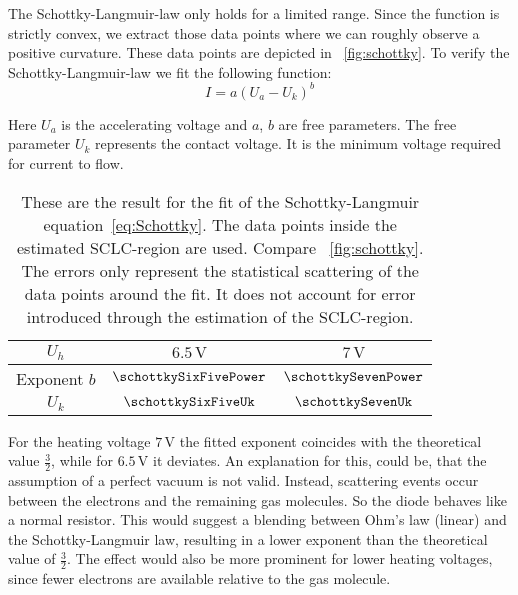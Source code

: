 \documentclass[a4paper,10pt,twocolumn]{article}
\newcommand{\volt}{\, \mathrm{V}}
\newcommand{\sixfiveV}{6.5 \volt}
\newcommand{\sevenV}{7 \volt}
\begin{document}
    The Schottky-Langmuir-law only holds for a limited range.
    Since the function is strictly convex, we extract those data points where we can roughly observe a 
    positive curvature.
    These data points are depicted in ~\autoref{fig:schottky}.
    To verify the Schottky-Langmuir-law we fit the following function:
    \begin{equation}
        \label{eq:Schottky}
        I = a (U_a - U_k)^{b}
    \end{equation}
    
    Here $U_a$ is the accelerating voltage and $a$, $b$ are free parameters.
    The free parameter $U_k$ represents the contact voltage.
    It is the minimum voltage required for current to flow.
    
    \begin{table}[h!]
        \centering
        \begin{tabular}{c c c}
            \hline \hline 
            $U_h$ & $\sixfiveV$ & $\sevenV$ \\
            \hline 
            Exponent $b$ & $\schottkySixFivePower$ & $\schottkySevenPower$ \\
            $U_k$ & $\schottkySixFiveUk$ & $\schottkySevenUk$ \\
            \hline \hline
        \end{tabular}
        \caption{These are the result for the fit of the Schottky-Langmuir equation~\eqref{eq:Schottky}.
        The data points inside the estimated SCLC-region are used.
        Compare ~\autoref{fig:schottky}.
        The errors only represent the statistical scattering of the data points around the fit.
        It does not account for error introduced through the estimation of the SCLC-region.}
        \label{tab:schottkyFit}
    \end{table}
    
    For the heating voltage $\sevenV$ the fitted exponent coincides with the theoretical value $\frac{3}{2}$, while
    for $\sixfiveV$ it deviates.
    An explanation for this, could be, that the assumption of a perfect vacuum is not valid.
    Instead, scattering events occur between the electrons and the remaining gas molecules.
    So the diode behaves like a normal resistor.
    This would suggest a blending between Ohm's law (linear) and the Schottky-Langmuir law, resulting in a lower
    exponent than the theoretical value of $\frac{3}{2}$.
    The effect would also be more prominent for lower heating voltages, since fewer electrons are available relative to
    the gas molecule.
    
\end{document}
